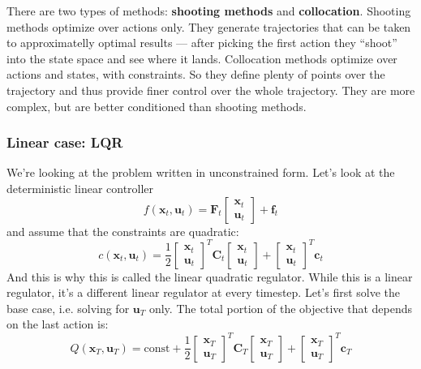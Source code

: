 \documentclass{report}
\begin{document}
There are two types of methods:
\textbf{shooting methods} and \textbf{collocation}.
Shooting methods optimize over actions only. They generate 
trajectories that can be taken to approximatelly optimal results ---
after picking the first action they ``shoot'' into the state space and see where it lands.
Collocation methods optimize over actions and states, with constraints.
So they define plenty of points over the trajectory and thus provide finer control
over the whole trajectory.
They are more complex, but are better conditioned than shooting methods.

\subsubsection{Linear case: LQR}
We're looking at the problem written in unconstrained form.
Let's look at the deterministic linear controller
\begin{equation}
f (\bm{x}_{t}, \bm{u}_{t} ) = \bm{F}_{t} \begin{bmatrix} \bm{x}_{t} \\ \bm{u}_{t} \end{bmatrix} + \bm{f}_{t}
\end{equation}
and assume that the constraints are quadratic:
\begin{equation}
c (\bm{x}_{t}, \bm{u}_{t} ) = \frac{1}{2} \begin{bmatrix} \bm{x}_{t} \\ \bm{u}_{t} \end{bmatrix}^{ T } 
\bm{C}_{t} \begin{bmatrix} \bm{x}_{t} \\ \bm{u}_{t} \end{bmatrix} + \begin{bmatrix} \bm{x}_{t} \\ \bm{u}_{t} \end{bmatrix}^{ T } \bm{c}_{t}
\end{equation}
And this is why this is called the linear quadratic regulator.
While this is a linear regulator, it's a different linear regulator at every timestep.
Let's first solve the base case, i.e. solving for $ \bm{u}_{T}  $ only.
The total portion of the objective that depends on the last action is:
\begin{equation}
		Q (\bm{x}_{T}, \bm{u}_{T} ) = \text{const} + \frac{1}{2} \begin{bmatrix} \bm{x}_{T} \\ \bm{u}_{T} \end{bmatrix}^{ T } 
\bm{C}_{T} \begin{bmatrix} \bm{x}_{T} \\ \bm{u}_{T} \end{bmatrix} + \begin{bmatrix} \bm{x}_{T} \\ \bm{u}_{T} \end{bmatrix}^{ T } \bm{c}_{T}
\end{equation}
\end{document}

